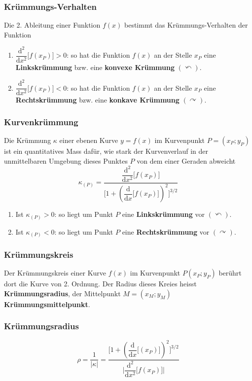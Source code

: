 \subsubsection{Krümmungs-Verhalten}
Die 2. Ableitung einer Funktion $f\left(x\right)$ bestimmt das Krümmungs-Verhalten der Funktion
\begin{enumerate}[$(a)$]
\item $\dfrac{\text{d}^2}{\text{d}x^2}\Big[f\left(x_P\right)\Big]>0$: so hat die Funktion $f\left(x\right)$ an der Stelle $x_P$ eine \textbf{Linkskrümmung} bzw. eine \textbf{konvexe Krümmung} $\left(\curvearrowleft\right)$.
\item $\dfrac{\text{d}^2}{\text{d}x^2}\Big[f\left(x_P\right)\Big]<0$: so hat die Funktion $f\left(x\right)$ an der Stelle $x_P$ eine \textbf{Rechtskrümmung} bzw. eine \textbf{konkave Krümmung} $\left(\curvearrowright\right)$.
\end{enumerate}
\subsubsection{Kurvenkrümmung}
Die Krümmung $\kappa$ einer ebenen Kurve $y=f\left(x\right)$ im Kurvenpunkt $P=\left(x_P; y_P\right)$ ist ein quantitatives Mass dafür, wie stark der Kurvenverlauf in der unmittelbaren Umgebung dieses Punktes $P$ von dem einer Geraden abweicht
\begin{equation}
\boxed{\kappa_{\left(P\right)}=\dfrac{\dfrac{\text{d}^2}{\text{d}x^2}\Big[f\left(x_P\right)\Big]}{\Big[1+\left(\dfrac{\text{d}}{\text{d}x}\Big[f\left(x_P\right)\Big]\right)^2\Big]^{3/2}}}
\end{equation}
\begin{enumerate}[$(a)$]
\item Ist $\kappa_{\left(P\right)}>0$: so liegt um Punkt $P$ eine \textbf{Linkskrümmung} vor $\left(\curvearrowleft\right)$.
\item Ist $\kappa_{\left(P\right)}<0$: so liegt um Punkt $P$ eine \textbf{Rechtskrümmung} vor $\left(\curvearrowright\right)$.
\end{enumerate}
\subsubsection{Krümmungskreis}
Der Krümmungskreis einer Kurve $f\left(x\right)$ im Kurvenpunkt $P\left(x_P;y_P\right)$ berührt dort die Kurve von 2. Ordnung. Der Radius dieses Kreies heisst \textbf{Krümmungsradius}, der Mittelpunkt $M=\left(x_M; y_M\right)$ \textbf{Krümmungsmittelpunkt}. 
\subsubsection{Krümmungsradius}
\begin{equation}
\boxed{\rho=\dfrac{1}{\Big\vert \kappa\Big\vert}=\dfrac{\Big[1+\left(\dfrac{\text{d}}{\text{d}x}\Big[\left(x_P\right)\Big]\right)^2\Big]^{3/2}}{\Big\vert \dfrac{\text{d}^2}{\text{d}x^2}\Big[f\left(x_P\right)\Big]\Big\vert}}
\end{equation}
